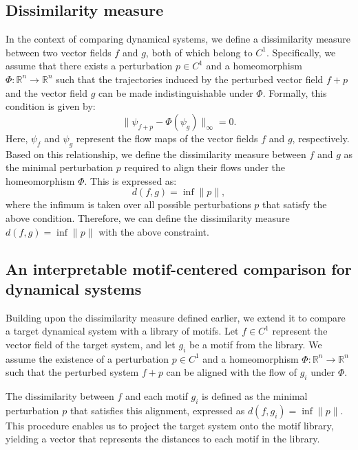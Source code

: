 \documentclass{article}
\theoremstyle{definition} \newtheorem{definition}{Definition}  \newtheorem{example}{Example}
\theoremstyle{remark} \newtheorem{remark}{Remark}
\newcounter{ct}
\begin{document}
\subsection{Dissimilarity measure}
In the context of comparing dynamical systems, we define a dissimilarity measure between two vector fields \( f \) and \( g \), both of which belong to \( C^1 \). Specifically, we assume that there exists a perturbation \( p \in C^1 \) and a homeomorphism \( \Phi: \mathbb{R}^n \rightarrow \mathbb{R}^n \) such that the trajectories induced by the perturbed vector field \( f + p \) and the vector field \( g \) can be made indistinguishable under \( \Phi \). Formally, this condition is given by:
\begin{equation}\label{eq:}
\|\psi_{f+p} - \Phi(\psi_{g})\|_\infty = 0.
\end{equation}
Here, \( \psi_{f} \) and \( \psi_{g} \) represent the flow maps of the vector fields \( f \) and \( g \), respectively. Based on this relationship, we define the dissimilarity measure between \( f \) and \( g \) as the minimal perturbation \( p \) required to align their flows under the homeomorphism \( \Phi \). This is expressed as:
\begin{equation}
d(f, g) = \inf \|p\|,  %
\end{equation}
where the infimum is taken over all possible perturbations \( p \) that satisfy the above condition.
Therefore, we can define the dissimilarity measure $d(f,g) = \inf \|p\|$ with the above constraint.




\subsection{An interpretable motif-centered comparison for dynamical systems}\label{sec:aut_motif_metric}
Building upon the dissimilarity measure defined earlier, we extend it to compare a target dynamical system with a library of motifs. Let \( f \in C^1 \) represent the vector field of the target system, and let \( g_i \) be a motif from the library. We assume the existence of a perturbation \( p \in C^1 \) and a homeomorphism \( \Phi: \mathbb{R}^n \rightarrow \mathbb{R}^n \) such that the perturbed system \( f + p \) can be aligned with the flow of \( g_i \) under \( \Phi \). 

The dissimilarity between \( f \) and each motif \( g_i \) is defined as the minimal perturbation \( p \) that satisfies this alignment, expressed as \( d(f, g_i) = \inf \|p\| \).
 This procedure enables us to project the target system onto the motif library, yielding a vector that represents the distances to each motif in the library.
\end{document}
